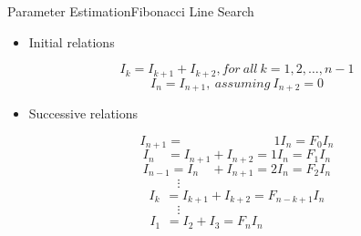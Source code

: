 \begin{frame}{Parameter Estimation}{Fibonacci Line Search}
\begin{minipage}{\linewidth}
\begin{minipage}{0.40\linewidth}
{\begin{figure}[H]
      \end{figure}
      }
    \end{minipage}
    \begin{minipage}{0.45\linewidth}
      \pause[5]
        \begin{itemize}
          \item Initial relations
        \end{itemize}
        \begin{displaymath}
          \si{I_k = I_{k+1} + I_{k+2}, for\ all\ k=1,2,\dots,n-1}
        \end{displaymath}
        \begin{displaymath}
          \si{I_n = I_{n+1},\ assuming\ I_{n+2}=0}
        \end{displaymath}
      \vspace{-12pt}
      \pause[6]
        \begin{itemize}
          \item Successive relations
        \end{itemize}
        \begin{displaymath}
          \si{I_{n+1}}      =  \phantom{\si{\ I_{n+1}  + I_{n+2}         =}}\si{ 1 I_n  = F_0 I_n}
        \end{displaymath}
        \begin{displaymath}
          \si{I_{n}}\phantom{_{+1}}      =  \si{ I_{n+1}  + I_{n+2} }                    =  \si{ 1 I_n  = F_1 I_n }
        \end{displaymath}
        \begin{displaymath}
          \si{I_{n-1}}      =  \si{ I_{n} }\phantom{_{+1}} + \si{ I_{n+1} } =  \si{ 2 I_n  = F_2 I_n }
        \end{displaymath}
        \begin{displaymath}
          \vdots
          \phantom{I_{n-4}+I_{n-5}+I{4242}}
        \end{displaymath}
        \begin{displaymath}
          \si{I_{k}}\phantom{_{4}}   =  \si{ I_{k+1} + I_{k+2} = F_{n-k+1} I_n }
        \end{displaymath}
        \begin{displaymath}
          \vdots                         
          \phantom{I_{n-4}+I_{n-5}+I{4242}}
        \end{displaymath}
        \begin{displaymath}
          \si{I_{1}}\phantom{_{4}}      =  \si{ I_{2}  + I_{3} }\si{= F_n I_n }\phantom{_{k-1k+2k+3}} 
        \end{displaymath}
    \end{minipage}
  \end{minipage}
\end{frame}


